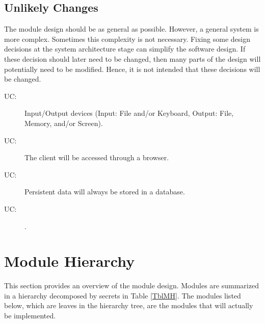 \documentclass[12pt, titlepage]{article}
\newcounter{ucnum}
\newcommand{\uctheucnum}{UC\theucnum}
\begin{document}
\subsection{Unlikely Changes} \label{SecUchange}

The module design should be as general as possible. However, a general system is
more complex. Sometimes this complexity is not necessary. Fixing some design
decisions at the system architecture stage can simplify the software design. If
these decision should later need to be changed, then many parts of the design
will potentially need to be modified. Hence, it is not intended that these
decisions will be changed.

\begin{description}
\item[ \uctheucnum \label{ucIO}:] Input/Output devices
  (Input: File and/or Keyboard, Output: File, Memory, and/or Screen).
\item[ \uctheucnum \label{ucI1}:] The client will be accessed through a browser.
\item[ \uctheucnum \label{ucI2}:] Persistent data will always be stored in a database.
\item[ \uctheucnum \label{ucI3}:] .

\end{description}

\section{Module Hierarchy} \label{SecMH}

This section provides an overview of the module design. Modules are summarized
in a hierarchy decomposed by secrets in Table \ref{TblMH}. The modules listed
below, which are leaves in the hierarchy tree, are the modules that will
actually be implemented.
\end{document}
